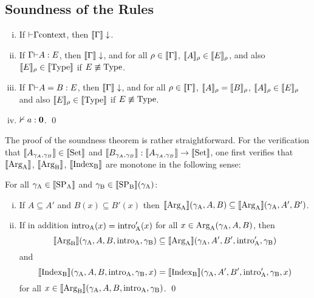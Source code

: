 \documentclass{article}
\begin{document}
\subsection{Soundness of the Rules}
\begin{theorem}[Soundness] \mbox{}
\label{thm:soundness}
  \begin{enumerate}[(i)]
  \item If ${} \tstile \Gamma \text{context}$, then
    $\sem{\Gamma}\downarrow$. 
  \item If $\Gamma \tstile A : E$, then $\sem{\Gamma}\downarrow$, and
    for all $\rho \in \sem{\Gamma}$, ${\sem{A}_\rho \in \sem{E}_\rho}$, and also
    $\sem{E}_\rho \in \sem{\TYPE}$ if $E \not\equiv \TYPE$.
  \item If $\Gamma \tstile A = B : E$, then $\sem{\Gamma}\downarrow$, and
    for all $\rho \in \sem{\Gamma}$, $\sem{A}_\rho = \sem{B}_\rho$,
    $\sem{A}_\rho \in \sem{E}_\rho$ and also $\sem{E}_\rho \in \sem{\TYPE}$ if
    $E \not\equiv \TYPE$. 
  \item $\nvdash a : \zero$. \qed
  \end{enumerate}
\end{theorem}
The proof of the soundness theorem is rather
  straight\-forward. For the verification that $\sem{A_{\gamma_A, \gamma_B}}
  \in \sem{\Set}$ and $\sem{B_{\gamma_A, \gamma_B}} : \sem{A_{\gamma_A,
      \gamma_B}} \to \sem{\Set}$, one first verifies that $\sem{\ArgA}$,
  $\sem{\ArgB}$, $\sem{\IndexB}$ are monotone in the following sense:
  \begin{lemma}
  \label{thm:Arg-monotone}
  For all $\gammaA \in \sem{\SPA}$ and $\gammaB \in \sem{\SPB}(\gammaA)$:
  \begin{enumerate}[(i)]
  \item If $A \subseteq A'$ and $B(x) \subseteq B'(x)$ then
    $\sem{\ArgA}(\gammaA, A, B) \subseteq \sem{\ArgA}(\gammaA, A', B')$.
  \item If in addition $\introA(x) = \introA'(x)$ for all $x \in \ArgA(\gammaA, A, B)$, then
    \[
    \sem{\ArgB}(\gammaA, A, B, \introA, \gammaB) \subseteq \sem{\ArgA}(\gammaA, A', B', \introA', \gammaB)
    \]
    and
    \[    
    \sem{\IndexB}(\gammaA, A, B, \introA, \gammaB, x) = \sem{\IndexB}(\gammaA, A', B', \introA', \gammaB, x)
    \]
    for all $x \in \sem{\ArgB}(\gammaA, A, B, \introA, \gammaB)$. \qed
  \end{enumerate}
  \end{lemma}
\end{document}
